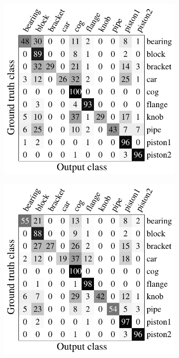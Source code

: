 \begin{figure}[ht]
\begin{subfigure}[t]{0.32\linewidth}
		\includegraphics[width=1\linewidth]{fig/reg/confusion_meanshift.pdf}
	\end{subfigure}
	\begin{subfigure}[t]{0.32\linewidth}
		\label{fig/reg/confusion_intrinsic}
		\includegraphics[width=1\linewidth]{fig/reg/confusion_intrinsic.pdf}

\end{subfigure}
\end{figure}
